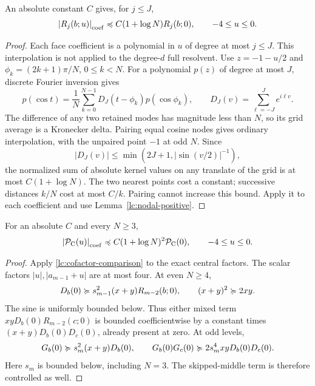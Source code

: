 \begin{lemma}\label{lc:interpolation}
An absolute constant \(C\) gives, for \(j\le J\),
\begin{equation}\label{lc:cofactor-comparison}
 \left|R_j(b;u)\right|_{\rm coef}\preccurlyeq C(1+\log N)R_j(b;0),\qquad -4\le u\le0.
\end{equation}
\end{lemma}
\begin{proof}
Each face coefficient is a polynomial in \(u\) of degree at most
\(j\le J\). This interpolation is not applied to the degree-\(d\)
full resolvent. Use \(z=-1-u/2\) and
\(\phi_k=(2k+1)\pi/N\), \(0\le k<N\).
For a polynomial \(p(z)\) of degree at most \(J\), discrete Fourier
inversion gives
\[
 p(\cos t)=\frac1N\sum_{k=0}^{N-1}D_J(t-\phi_k)p(\cos\phi_k),
 \qquad D_J(v)=\sum_{\ell=-J}^Je^{i\ell v}.
\]
The difference of any two retained modes has magnitude less than \(N\),
so its grid average is a Kronecker delta. Pairing equal cosine nodes
gives ordinary interpolation, with the unpaired point \(-1\) at odd \(N\).
Since
\[
 |D_J(v)|\le\min(2J+1,|\sin(v/2)|^{-1}),
\]
the normalized sum of absolute kernel values on any translate of the
grid is at most \(C(1+\log N)\). The two nearest points cost a constant;
successive distances \(k/N\) cost at most \(C/k\). Pairing cannot
increase this bound. Apply it to each coefficient and use
Lemma~\ref{lc:nodal-positive}.
\end{proof}

\begin{proposition}\label{lc:central-comparison}
For an absolute \(C\) and every \(N\ge3\),
\begin{equation}\label{lc:central-coefficientwise}
 \left|\mathcal P_{\mathrm C}(u)\right|_{\rm coef}
 \preccurlyeq C(1+\log N)^2\mathcal P_{\mathrm C}(0),\qquad -4\le u\le0.
\end{equation}
\end{proposition}
\begin{proof}
Apply \eqref{lc:cofactor-comparison} to the exact central factors.
The scalar factors \(|u|,|a_{m-1}+u|\) are at most four.
At even \(N\ge4\),
\[
 D_b(0)\succcurlyeq s_{m-1}^2(x+y)R_{m-2}(b;0),\qquad (x+y)^2\succcurlyeq2xy.
\]
The sine is uniformly bounded below. Thus either mixed term
\(xyD_b(0)R_{m-2}(c;0)\) is bounded coefficientwise by a constant
times \((x+y)D_b(0)D_c(0)\), already present at zero.
At odd levels,
\[
 G_b(0)\succcurlyeq s_m^2(x+y)D_b(0),\qquad
 G_b(0)G_c(0)\succcurlyeq2s_m^4xyD_b(0)D_c(0).
\]
Here \(s_m\) is bounded below, including \(N=3\).
The skipped-middle term is therefore controlled as well.
\end{proof}

